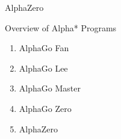 \documentclass{beamer}
\begin{document}
  {
    \begin{frame}[standout]
    \end{frame}
  }

  {
    \begin{frame}[standout]
      \epigraph{}{\color{gray!20}\Huge AlphaZero}
    \end{frame}
  }

  {
    \begin{frame}{Overview of Alpha* Programs}
      \pause
      \begin{enumerate}[<+- | alert@+>]
        \item AlphaGo Fan
        \item AlphaGo Lee
        \item AlphaGo Master
        \item AlphaGo Zero
        \item AlphaZero
      \end{enumerate}
    \end{frame}
  }
\end{document}
